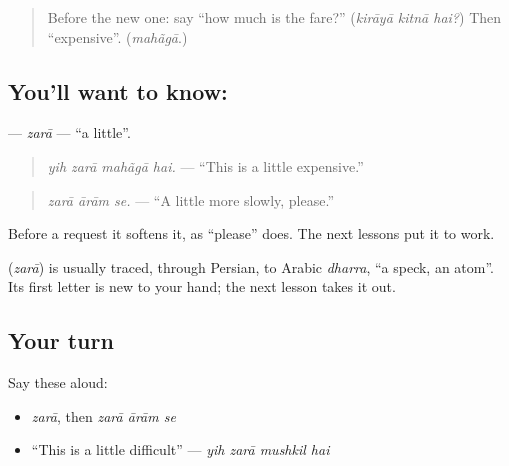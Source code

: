 \label{lesson:UR-C270-zara}



\begin{quote}
Before the new one: say \textquotedblleft{}how much is the fare?\textquotedblright{} (\emph{kirāyā kitnā hai?}) Then \textquotedblleft{}expensive\textquotedblright{}. (\emph{mahãgā}.)
\end{quote}

\subsection*{You'll want to know: }
\textbf{} — \emph{zarā} — \textquotedblleft{}a little\textquotedblright{}.

\begin{quote}
\textbf{   }
\end{quote}

\begin{quote}
\emph{yih zarā mahãgā hai.} — \textquotedblleft{}This is a little expensive.\textquotedblright{}
\end{quote}

\begin{quote}
\textbf{  }
\end{quote}

\begin{quote}
\emph{zarā ārām se.} — \textquotedblleft{}A little more slowly, please.\textquotedblright{}
\end{quote}

Before a request it softens it, as \textquotedblleft{}please\textquotedblright{} does. The next lessons put it to work.

\begin{cousinweb}
\textbf{} (\emph{zarā}) is usually traced, through Persian, to Arabic \emph{dharra}, \textquotedblleft{}a speck, an atom\textquotedblright{}. Its first letter is new to your hand; the next lesson takes it out.
\end{cousinweb}

\subsection*{Your turn}
Say these aloud:

\begin{itemize}
\raggedright
  \item \emph{zarā}, then \emph{zarā ārām se}
  \item \textquotedblleft{}This is a little difficult\textquotedblright{} — \emph{yih zarā mushkil hai}
\end{itemize}

